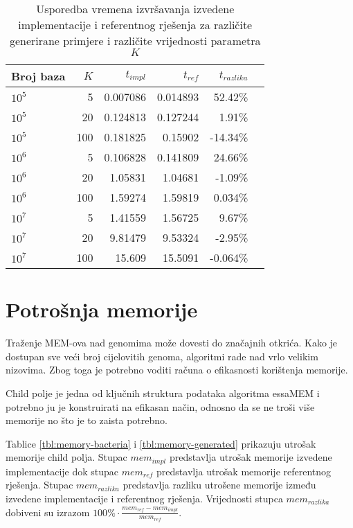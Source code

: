 \documentclass[times, utf8, seminar, numeric]{fer}
\begin{document}
\begin{table}[h]
	\centering
	\caption{Usporedba vremena izvršavanja izvedene implementacije i referentnog rješenja za različite generirane primjere i različite vrijednosti parametra $K$}
	\label{tbl:time-generated}
	
	\begin{tabular}{lrrrrr}
		\hline
        Broj baza & $K$ & $t_{impl}$ & $t_{ref}$ & $t_{razlika}$ \\ \hline
        $10^5$ & 5 & 0.007086 & 0.014893 & 52.42\% \\
        $10^5$ & 20 & 0.124813 & 0.127244 & 1.91\% \\
        $10^5$ & 100 & 0.181825 & 0.15902 & -14.34\% \\ \hline
        $10^6$ & 5 & 0.106828 & 0.141809 & 24.66\% \\
        $10^6$ & 20 & 1.05831 & 1.04681 & -1.09\% \\
        $10^6$ & 100 & 1.59274 & 1.59819 & 0.034\% \\ \hline
        $10^7$ & 5 & 1.41559 & 1.56725 & 9.67\% \\
        $10^7$ & 20 & 9.81479 & 9.53324 & -2.95\% \\
        $10^7$ & 100 & 15.609 & 15.5091 & -0.064\% \\
    \hline
	\end{tabular}
\end{table}

\section{Potrošnja memorije}
Traženje MEM-ova nad genomima može dovesti do značajnih otkrića. Kako je dostupan sve veći broj cijelovitih genoma, algoritmi rade nad vrlo velikim nizovima. Zbog toga je potrebno voditi računa o efikasnosti korištenja memorije. 

Child polje je jedna od ključnih struktura podataka algoritma essaMEM i potrebno ju je konstruirati na efikasan način, odnosno da se ne troši više memorije no što je to zaista potrebno.

Tablice \ref{tbl:memory-bacteria} i \ref{tbl:memory-generated} prikazuju utrošak memorije child polja. Stupac $mem_{impl}$  predstavlja utrošak memorije izvedene implementacije dok stupac $mem_{ref}$ predstavlja utrošak memorije referentnog rješenja. Stupac $mem_{razlika}$ predstavlja razliku utrošene memorije između izvedene implementacije i referentnog rješenja. Vrijednosti stupca $mem_{razlika}$ dobiveni su izrazom $100\% \cdot \frac{mem_{ref} - mem_{impl}}{mem_{ref}}$.
\end{document}
